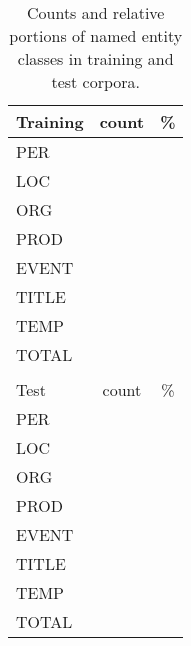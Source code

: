\documentclass[11pt]{article}
\begin{document}
\begin{table}[h!]
\begin{center}
\begin{tabular}{lcc} 
\hline
\noalign{\smallskip}
Training & count & \% \\ 
\hline
\noalign{\smallskip}
PER & & \\
LOC & &  \\
ORG & & \\
PROD & & \\
EVENT & & \\
TITLE & & \\
TEMP & & \\
\hline
\noalign{\smallskip}
TOTAL & & \\
& & \\
\hline
\noalign{\smallskip}
Test & count & \% \\ 
\hline
\noalign{\smallskip}
PER & & \\
LOC & &  \\
ORG & & \\
PROD & & \\
EVENT & & \\
TITLE & & \\
TEMP & & \\
\hline
\noalign{\smallskip}
TOTAL & & \\\end{tabular}
\end{center}
\caption{Counts and relative portions of named entity classes in training and test corpora.}
\label{tab: statistics} 
\end{table}





\end{document}
